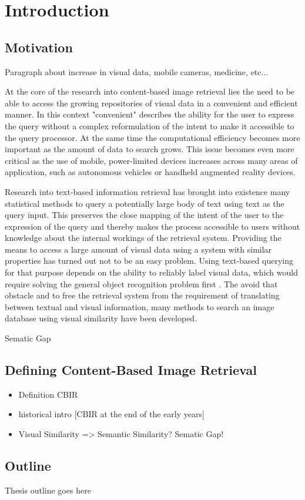 \chapter{Introduction}\label{ch:introduction}

\section{Motivation}

Paragraph about increase in visual data, mobile cameras, medicine, etc...

At the core of the research into content-based image retrieval lies the need to
be able to access the growing repositories of visual data in a convenient and
efficient manner.  In this context "convenient" describes the ability for the
user to express the query without a complex reformulation of the intent to make
it accessible to the query processor. At the same time the computational
efficiency becomes more important as the amount of data to search grows. This
issue becomes even more critical as the use of mobile, power-limited devices
increases across many areas of application, such as autonomous vehicles or
handheld augmented reality devices.

Research into text-based information retrieval has brought into existence many
statistical methods to query a potentially large body of text using text as the
query input. This preserves the close mapping of the intent of the user to the
expression of the query and thereby makes the process accessible to users
without knowledge about the internal workings of the retrieval system.
Providing the means to access a large amount of visual data using a system with
similar properties has turned out not to be an easy problem. Using text-based
querying for that purpose depends on the ability to reliably label visual data,
which would require solving the general object recognition problem first
\autocite{smeulders_content-based_2000}. The avoid that obstacle and to free
the retrieval system from the requirement of translating between textual and
visual information, many methods to search an image database using visual
similarity have been developed.

Sematic Gap

\section{Defining Content-Based Image Retrieval}



\begin{itemize}
    \item Definition CBIR
    \item historical intro [CBIR at the end of the early years]
    \item Visual Similarity => Semantic Similarity? Sematic Gap! \autocite{smeulders_content-based_2000}
\end{itemize}


\section{Outline}

Thesis outline goes here
